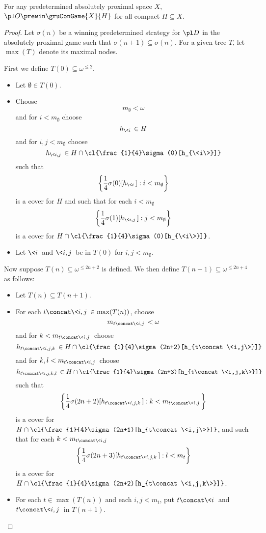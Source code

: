 \begin{thm}
  For any predetermined absolutely proximal space $X$,
  $\pl O\prewin \gruConGame{X}{H}$ for all compact $H\subseteq X$.
\end{thm}

\begin{proof}
  Let $\sigma(n)$ be a winning predetermined strategy for $\pl D$ in the
  absolutely proximal game such that
  $\sigma(n+1)\subseteq \sigma(n)$.
  For a given tree $T$, let $\max(T)$ denote its maximal nodes.

  \bigskip

  First we define $T(0)\subseteq \omega^{\leq 2}$.

  \begin{itemize}
    \item Let $\emptyset\in T(0)$.
    \item Choose
      \[
        m_{\emptyset}<\omega
      \]
      and for $i<m_{\emptyset}$ choose
      \[
        h_{\<i\>}\in H
      \]
      and for $i,j<m_{\emptyset}$ choose
      \[
        h_{\<i,j\>}
          \in
        H\cap\cl{\frac{1}{4}\sigma(0)[h_{\<i\>}]}
      \]
      such that
        \[
          \left\{\frac{1}{4}\sigma(0)[h_{\<i\>}]:i<m_{\emptyset}\right\}
        \]
      is a cover for $H$ and such that for each $i<m_{\emptyset}$
        \[
          \left\{\frac{1}{4}\sigma(1)[h_{\<i,j\>}]:j<m_{\emptyset}\right\}
        \]
      is a cover for
      $H\cap\cl{\frac{1}{4}\sigma(0)[h_{\<i\>}]}$.
    \item Let $\<i\>$ and $\<i,j\>$ be in $T(0)$ for $i,j<m_{\emptyset}$.
  \end{itemize}

  \bigskip

  Now suppose $T(n)\subseteq \omega^{\leq 2n+2}$ is defined.
  We then define $T(n+1)\subseteq \omega^{\leq 2n+4}$ as follows:

  \begin{itemize}
    \item Let $T(n)\subseteq T(n+1)$.
    \item For each $t\concat\<i,j\>\in\max(T(n))$, choose
        \[m_{t\concat\<i,j\>}<\omega\]
        and for $k<m_{t\concat\<i,j\>}$ choose
          \[
            h_{t\concat\<i,j,k\>}
              \in
            H\cap \cl{\frac{1}{4}\sigma(2n+2)[h_{t\concat\<i,j\>}]}
          \]
        and for $k,l<m_{t\concat\<i,j\>}$ choose
          \[
            h_{t\concat\<i,j,k,l\>}
              \in
            H\cap\cl{\frac{1}{4}\sigma(2n+3)[h_{t\concat\<i,j,k\>}]}
          \]
        such that
      \[
        \left\{\frac{1}{4}\sigma(2n+2)[h_{t\concat\<i,j,k\>}]
          :
        k<m_{t\concat\<i,j\>}\right\}
      \]
    is a cover for $H\cap \cl{\frac{1}{4}\sigma(2n+1)[h_{t\concat\<i,j\>}]}$,
    and such that for each $k<m_{t\concat\<i,j\>}$
      \[
        \left\{\frac{1}{4}\sigma(2n+3)[h_{t\concat\<i,j,k\>}]:l<m_t\right\}
      \]
    is a cover for $H\cap\cl{\frac{1}{4}\sigma(2n+2)[h_{t\concat\<i,j,k\>}]}$.
    \item For each $t\in\max(T(n))$ and each $i,j<m_t$, put $t\concat\<i\>$
      and $t\concat\<i,j\>$ in $T(n+1)$.
  \end{itemize}


\end{proof}
